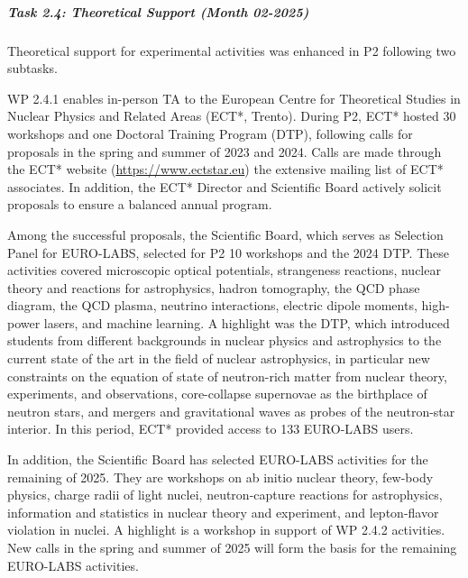 \subparagraph{Task 2.4: Theoretical Support (Month 02-2025)} \mbox{}


Theoretical support for experimental activities was enhanced in P2 following two subtasks. 

WP 2.4.1 enables in-person TA to the European Centre for Theoretical Studies in Nuclear Physics and Related Areas (ECT*, Trento). During P2, ECT* hosted 30 workshops and one Doctoral Training Program (DTP), following calls for proposals in the spring and summer of  2023 and 2024. Calls are made through the ECT* website (\url{https://www.ectstar.eu}) the extensive mailing list of ECT* associates. In addition, the ECT* Director and Scientific Board actively solicit proposals to ensure a balanced annual program.

Among the successful proposals, the Scientific Board, which serves as Selection Panel for EURO-LABS, selected for P2 10 workshops and the 2024 DTP. These activities covered microscopic optical potentials, strangeness reactions, nuclear theory and reactions for astrophysics, hadron tomography, the QCD phase diagram, the QCD plasma, neutrino interactions, electric dipole moments, high-power lasers, and machine learning. A highlight was the DTP, which introduced students from different backgrounds in nuclear physics and astrophysics to the current state of the art in the field of nuclear astrophysics, in particular new constraints on the equation of state of neutron-rich matter from nuclear theory, experiments, and observations, core-collapse supernovae as the birthplace of neutron stars, and mergers and gravitational waves as probes of the neutron-star interior. In this period, ECT* provided access to 133 EURO-LABS users. 

In addition, the Scientific Board has selected EURO-LABS activities for the remaining of 2025. They are workshops on ab initio nuclear theory, few-body physics, charge radii of light nuclei, neutron-capture reactions for astrophysics, information and statistics in nuclear theory and experiment, and lepton-flavor violation in nuclei. A highlight is a workshop in support of WP 2.4.2 activities. New calls in the spring and summer of 2025 will form the basis for the remaining EURO-LABS activities.


